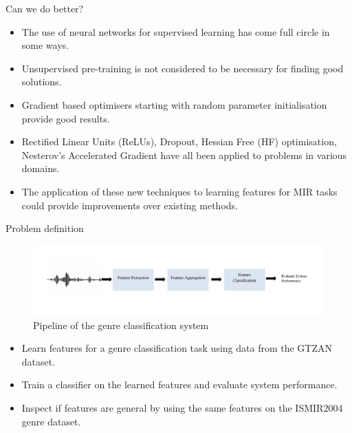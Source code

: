 \documentclass{beamer}
\begin{document}
\begin{frame}{Can we do better?}
  \begin{itemize}
    \item The use of neural networks for supervised learning has come full circle in some ways.
    \item Unsupervised pre-training is not considered to be necessary for finding good solutions. 
    \item Gradient based optimisers starting with random parameter initialisation provide good results. 
    \item Rectified Linear Units (ReLUs), Dropout, Hessian Free (HF) optimisation, Nesterov's Accelerated Gradient have all been applied to problems in various domains.
    \item The application of these new techniques to learning features for MIR tasks could provide improvements over existing methods.  
  \end{itemize}
\end{frame}

\begin{frame}{Problem definition}
\begin{figure}
  \begin{center}
    \includegraphics[scale=0.4]{Figures/pipeline.pdf}
  \end{center}
\caption{Pipeline of the genre classification system}
\end{figure}
  \begin{itemize}
    \item Learn features for a genre classification task using data from the GTZAN dataset.
    \item Train a classifier on the learned features and evaluate system performance.
    \item Inspect if features are general by using the same features on the ISMIR2004 genre dataset. 
  \end{itemize}  
\end{frame}
\end{document}
